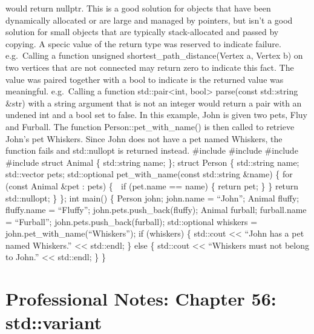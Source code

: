 would return nullptr. This is a good solution for objects that have been
dynamically allocated or are large and managed by pointers, but isn't a
good solution for small objects that are typically stack-allocated and
passed by copying. A specic value of the return type was reserved to
indicate failure. e.g.~Calling a function unsigned
shortest\_path\_distance(Vertex a, Vertex b) on two vertices that are
not connected may return zero to indicate this fact. The value was
paired together with a bool to indicate is the returned value was
meaningful. e.g.~Calling a function std::pair\textless int,
bool\textgreater{} parse(const std::string \&str) with a string argument
that is not an integer would return a pair with an undened int and a
bool set to false. In this example, John is given two pets, Fluy and
Furball. The function Person::pet\_with\_name() is then called to
retrieve John's pet Whiskers. Since John does not have a pet named
Whiskers, the function fails and std::nullopt is returned instead.
\#include \#include \#include \#include struct Animal \{ std::string
name; \}; struct Person \{ std::string name; std::vector pets;
std::optional pet\_with\_name(const std::string \&name) \{ for (const
Animal \&pet : pets) \{  if (pet.name == name) \{ return pet; \} \}
return std::nullopt; \} \}; int main() \{ Person john; john.name =
``John''; Animal fluffy; fluffy.name = ``Fluffy'';
john.pets.push\_back(fluffy); Animal furball; furball.name =
``Furball''; john.pets.push\_back(furball); std::optional whiskers =
john.pet\_with\_name(``Whiskers''); if (whiskers) \{ std::cout
\textless\textless{} ``John has a pet named Whiskers.''
\textless\textless{} std::endl; \} else \{ std::cout
\textless\textless{} ``Whiskers must not belong to John.''
\textless\textless{} std::endl; \} \}

\hypertarget{professional-notes-chapter-56-stdvariant-1}{%
\chapter{Professional Notes: Chapter 56:
std::variant}\label{professional-notes-chapter-56-stdvariant-1}}

